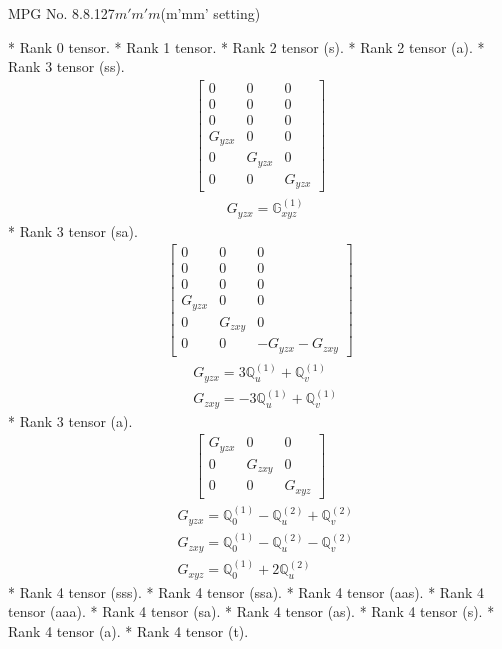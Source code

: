 \documentclass[fleqn,8pt,landscape]{jsarticle}
\begin{document}
\setcounter{MaxMatrixCols}{32}

\renewcommand{\tablename}{Table~}
\renewcommand{\figurename}{Figure~}
\begin{center}
\LARGE
MPG No. 8.8.127\quad$m'm'm$\quad(m'mm' setting)
\end{center}
* Rank 0 tensor.
* Rank 1 tensor.
* Rank 2 tensor (s).
* Rank 2 tensor (a).
* Rank 3 tensor (ss).
\begin{align*}
\begin{bmatrix} 0 & 0 & 0 \\ 0 & 0 & 0 \\ 0 & 0 & 0 \\ G_{yzx} & 0 & 0 \\ 0 & G_{yzx} & 0 \\ 0 & 0 & G_{yzx} \end{bmatrix}
\end{align*}
\begin{align*}
& G_{yzx} = \mathbb{G}_{xyz}^{(1)}
\end{align*}
* Rank 3 tensor (sa).
\begin{align*}
\begin{bmatrix} 0 & 0 & 0 \\ 0 & 0 & 0 \\ 0 & 0 & 0 \\ G_{yzx} & 0 & 0 \\ 0 & G_{zxy} & 0 \\ 0 & 0 & - G_{yzx} - G_{zxy} \end{bmatrix}
\end{align*}
\begin{align*}
& G_{yzx} = 3 \mathbb{Q}_{u}^{(1)} + \mathbb{Q}_{v}^{(1)} \\
& G_{zxy} = - 3 \mathbb{Q}_{u}^{(1)} + \mathbb{Q}_{v}^{(1)}
\end{align*}
* Rank 3 tensor (a).
\begin{align*}
\begin{bmatrix} G_{yzx} & 0 & 0 \\ 0 & G_{zxy} & 0 \\ 0 & 0 & G_{xyz} \end{bmatrix}
\end{align*}
\begin{align*}
& G_{yzx} = \mathbb{Q}_{0}^{(1)} - \mathbb{Q}_{u}^{(2)} + \mathbb{Q}_{v}^{(2)} \\
& G_{zxy} = \mathbb{Q}_{0}^{(1)} - \mathbb{Q}_{u}^{(2)} - \mathbb{Q}_{v}^{(2)} \\
& G_{xyz} = \mathbb{Q}_{0}^{(1)} + 2 \mathbb{Q}_{u}^{(2)}
\end{align*}
* Rank 4 tensor (sss).
* Rank 4 tensor (ssa).
* Rank 4 tensor (aas).
* Rank 4 tensor (aaa).
* Rank 4 tensor (sa).
* Rank 4 tensor (as).
* Rank 4 tensor (s).
* Rank 4 tensor (a).
* Rank 4 tensor (t).
\end{document}
